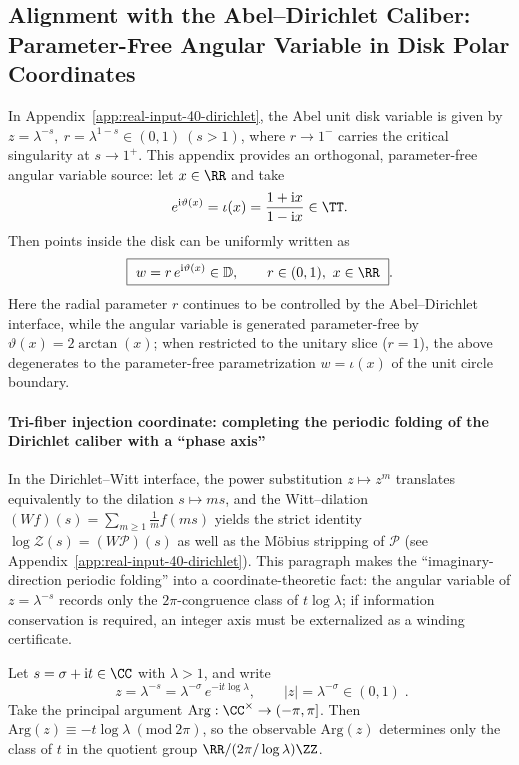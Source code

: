 \subsection{Alignment with the Abel--Dirichlet Caliber: Parameter-Free Angular Variable in Disk Polar Coordinates}\label{subsec:unit-circle-phase-abel-dirichlet}
In Appendix~\ref{app:real-input-40-dirichlet}, the Abel unit disk variable is given by
\(
z=\lambda^{-s},\ r=\lambda^{1-s}\in(0,1)\ (s>1)
\),
where \(r\to 1^{-}\) carries the critical singularity at \(s\to 1^{+}\).
This appendix provides an orthogonal, parameter-free angular variable source: let \(x\in\RR\) and take
\[
e^{\mathrm{i}\vartheta(x)}=\iota(x)=\frac{1+\mathrm{i}x}{1-\mathrm{i}x}\in\TT.
\]
Then points inside the disk can be uniformly written as
\begin{equation}\label{eq:unit-circle-phase-disk-polar}
\boxed{\ w=r\,e^{\mathrm{i}\vartheta(x)}\in\mathbb{D},\qquad r\in(0,1),\ x\in\RR\ }.
\end{equation}
Here the radial parameter \(r\) continues to be controlled by the Abel--Dirichlet interface, while the angular variable is generated parameter-free by \(\vartheta(x)=2\arctan(x)\); when restricted to the unitary slice (\(r=1\)), the above degenerates to the parameter-free parametrization \(w=\iota(x)\) of the unit circle boundary.

\paragraph{Tri-fiber injection coordinate: completing the periodic folding of the Dirichlet caliber with a ``phase axis''}
In the Dirichlet--Witt interface, the power substitution \(z\mapsto z^{m}\) translates equivalently to the dilation \(s\mapsto ms\), and the Witt--dilation
\(
(Wf)(s)=\sum_{m\ge 1}\frac{1}{m}f(ms)
\)
yields the strict identity \(\log\mathcal{Z}(s)=(W\mathcal{P})(s)\) as well as the M\"obius stripping of \(\mathcal{P}\) (see Appendix~\ref{app:real-input-40-dirichlet}).
This paragraph makes the ``imaginary-direction periodic folding'' into a coordinate-theoretic fact: the angular variable of \(z=\lambda^{-s}\) records only the \(2\pi\)-congruence class of \(t\log\lambda\); if information conservation is required, an integer axis must be externalized as a winding certificate.

\medskip
Let \(s=\sigma+\mathrm{i}t\in\CC\) with \(\lambda>1\), and write
\begin{equation}\label{eq:dirichlet-z-polar-decomposition}
\boxed{\;
z=\lambda^{-s}=\lambda^{-\sigma}\,e^{-\mathrm{i}t\log\lambda},
\qquad |z|=\lambda^{-\sigma}\in(0,1)\; }.
\end{equation}
Take the principal argument \(\mathrm{Arg}:\CC^{\times}\to(-\pi,\pi]\).
Then \(\mathrm{Arg}(z)\equiv -t\log\lambda\ (\mathrm{mod}\ 2\pi)\), so the observable \(\mathrm{Arg}(z)\) determines only the class of \(t\) in the quotient group
\(\RR/(2\pi/\log\lambda)\ZZ\).

